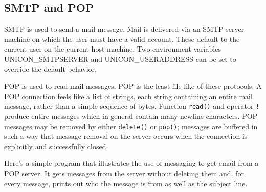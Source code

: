 \subsection*{SMTP and POP}

SMTP is used to send a mail message. Mail is delivered via
an SMTP server machine on which the user must have a valid account.
These default to the current user on the current host machine. Two
environment variables UNICON\_SMTPSERVER and UNICON\_USERADDRESS can be
set to override the default behavior.

POP is used to read mail messages. POP is the least file-like
of these protocols. A POP connection feels like a list of strings, each
string containing an entire mail message, rather than a simple sequence
of bytes. Function \texttt{read()} and operator \texttt{!} produce
entire messages which in general contain many newline characters. POP
messages may be removed by either \texttt{delete()} or \texttt{pop()};
messages are buffered in such a way that message removal on the server
occurs when the connection is explicitly and successfully closed.

Here's a simple program that illustrates the use of
messaging to get email from a POP server. It gets messages from the
server without deleting them and, for every message, prints out who the
message is from as well as the subject line.


